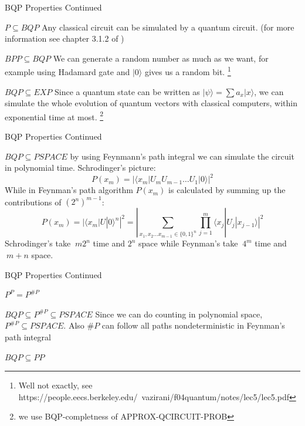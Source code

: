     \begin{frame}{BQP Properties Continued}
        \begin{block}{$P \subseteq BQP$}
            \pause
            Any classical circuit can be simulated by a quantum circuit. (for more information see chapter 3.1.2 of \cite{Nielsen11})
        \end{block}
        \begin{block}{$BPP \subseteq BQP$}
            \pause
            We can generate a random number as much as we want, for example using Hadamard gate and 
            $|0\rangle$ gives us a random bit. \footnote{Well not exactly, see https://people.eecs.berkeley.edu/~vazirani/f04quantum/notes/lec5/lec5.pdf}

        \end{block}
        \begin{block}{$BQP \subseteq EXP$}
            \pause
            Since a quantum state can be written as $|\psi \rangle = \sum a_x |x\rangle$, we can simulate
            the whole evolution of quantum vectors with classical computers, within exponential time at most. \footnote{we use BQP-completness of APPROX-QCIRCUIT-PROB}
        \end{block}
    \end{frame}
    \begin{frame}{BQP Properties Continued}
        \begin{block}{$BQP \subseteq PSPACE$}
            by using Feynmann's path integral we can simulate the circuit in polynomial time.
            Schrodinger's picture: 
            $$P(x_m) = |\langle x_m | U_m U_{m-1} \dots U_1| 0 \rangle|^2$$
            While in Feynman's path algorithm $P(x_m)$ is calculated by summing up the contributions of $(2^n)^{m-1}$:
            $$P(x_m) = |\langle x_m | U | 0 \rangle ^n|^2 = 
            | \sum_{x_1,x_2 \dots x_{m-1} \in \{0,1\}^n }^{} \prod_{j=1}^{m} \langle x_j | U_j | x_{j-1} \rangle |^2 $$
            Schrodinger's take $ ~ m 2^n$ time and $2^n$ space while Feynman's take 
            $~ 4^m$ time and $~ m + n$ space.
        \end{block}
    \end{frame}
    \begin{frame}{BQP Properties Continued}
        \begin{block}{$P^P = P^{\#P}$}
            
        \end{block}
        \pause
        \begin{block}{$BQP \subseteq P^{\# P} \subseteq PSPACE$}
            Since we can do counting in polynomial space, $P^{\#P} \subseteq PSPACE$. Also $\# P$ can follow all paths 
            nondeterministic in Feynman's path integral
        \end{block}
        \pause
        \begin{block}{$BQP \subseteq PP$}
            
        \end{block}
    \end{frame}
